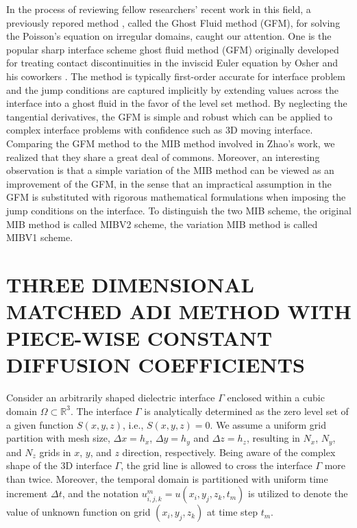 \documentclass[dissertation]{uathesis}
\begin{document}
\begin{body}
\begin{flushleft}
\hspace{1cm} In the process of reviewing fellow researchers' recent work in this field, a previously repored method \cite{liu2000, liu2017second}, called the Ghost Fluid method (GFM), for solving the Poisson's equation on irregular domains, caught our attention. One is the popular sharp interface scheme ghost fluid method (GFM) originally developed for treating contact discontinuities in the inviscid Euler equation by Osher and his coworkers \cite{fedkiw1999non}. The method is typically first-order accurate for interface problem and the jump conditions are captured implicitly by extending values across the interface into a ghost fluid in the favor of the level set method. By neglecting the tangential derivatives, the GFM is simple and robust which can be applied to complex interface problems  with confidence such as 3D moving interface. Comparing the GFM method to the MIB method involved in Zhao's work, we realized that they share a great deal of commons. Moreover, an interesting observation is that a simple variation of the MIB method can be viewed as an improvement of the GFM, in the sense that an impractical assumption in the GFM is substituted with rigorous mathematical formulations when imposing the jump conditions on the interface. To distinguish the two MIB scheme, the original MIB method is called MIBV2 scheme, the variation MIB method is called MIBV1 scheme.

\end{flushleft}

% 
\chapter{\MakeUppercase{Three dimensional matched ADI method with piece-wise constant diffusion coefficients}}

\begin{flushleft}

\hspace{1cm} Consider an arbitrarily shaped dielectric interface $\Gamma$ 
enclosed within a cubic domain $\Omega \subset \mathbb{R}^{3}$. 
The interface $\Gamma$ is analytically determined as the zero level set of a given
function $S(x,y,z)$, i.e., $S(x,y,z)=0$. 
We assume a uniform grid partition with mesh size, $\Delta x=h_{x}$, $\Delta y=h_{y}$ and $\Delta z=h_{z}$, resulting in $N_{x}$, $N_{y}$, and $N_{z}$ grids in $x$, $y$, and $z$ direction, respectively. Being aware of the complex shape of the 3D interface $\Gamma$, the grid line is allowed to cross the interface $\Gamma$ more than twice. Moreover, the temporal domain is partitioned with uniform time increment $\Delta t$, and the notation $u^{m}_{i,j,k} = u(x_{i},y_{j},z_{k},t_{m})$ is utilized to denote the value of unknown function on grid $(x_{i},y_{j},z_{k})$ at time step  $t_{m}$.


\end{flushleft}
\end{body}
\end{document}
